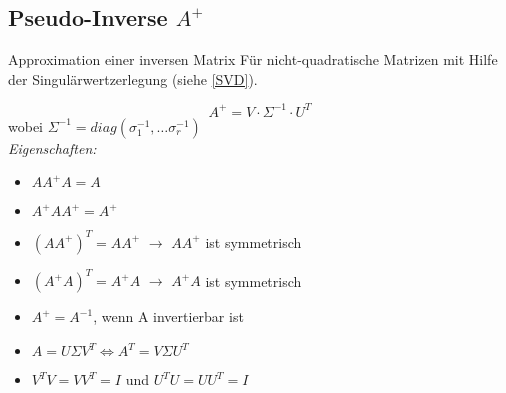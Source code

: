 \subsection{Pseudo-Inverse \(A^+\)}

Approximation einer inversen Matrix Für nicht-quadratische Matrizen mit Hilfe der Singulärwertzerlegung (siehe \ref{SVD}).

\begin{equation*}
    A^+ = V \cdot \Sigma^{-1} \cdot U^T
\end{equation*}
wobei \(\Sigma^{-1}=diag(\sigma_1^{-1}, \hdots \sigma_r^{-1})\)\\

\textit{Eigenschaften:}
\begin{itemize}
    \item \(A  A^+  A = A\)
    \item \(A^+  A  A^+ = A^+\)
    \item \((A  A^+)^T = A  A^+\) \(\rightarrow\) \(A  A^+\) ist symmetrisch
    \item \((A^+  A)^T = A^+  A\) \(\rightarrow\) \(A^+  A\) ist symmetrisch
    \item \(A^+ = A^{-1}\), wenn A invertierbar ist
    \item \(A = U \Sigma V^T \Leftrightarrow A^T = V \Sigma U^T \)
    \item \(V^TV=VV^T=I\) und \(U^TU=UU^T=I\)
\end{itemize}